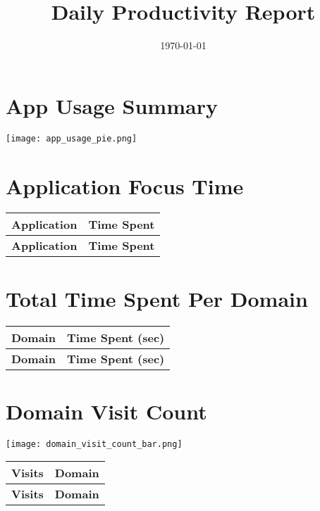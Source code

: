 \documentclass{book}
\title{Daily Productivity Report}
\date{\today}
\begin{document}
\maketitle

\section*{App Usage Summary}
\begin{center}
\texttt{[image: app\_usage\_pie.png]}
\end{center}

\section*{Application Focus Time}
\begin{longtable}{@{}L{0.3\textwidth}L{0.4\textwidth}@{}}
\toprule
\textbf{Application} & \textbf{Time Spent} \\
\midrule
\endfirsthead
\toprule
\textbf{Application} & \textbf{Time Spent} \\
\midrule
\endhead
\end{longtable}

\section*{Total Time Spent Per Domain}
\begin{longtable}{@{}L{0.6\textwidth}L{0.3\textwidth}@{}}
\toprule
\textbf{Domain} & \textbf{Time Spent (sec)} \\
\midrule
\endfirsthead
\toprule
\textbf{Domain} & \textbf{Time Spent (sec)} \\
\midrule
\endhead
\end{longtable}

\section*{Domain Visit Count}
\begin{center}
\texttt{[image: domain\_visit\_count\_bar.png]}
\end{center}

\begin{longtable}{@{}L{0.15\textwidth}L{0.75\textwidth}@{}}
\toprule
\textbf{Visits} & \textbf{Domain} \\
\midrule
\endfirsthead
\toprule
\textbf{Visits} & \textbf{Domain} \\
\midrule
\endhead
\end{longtable}
\end{document}
